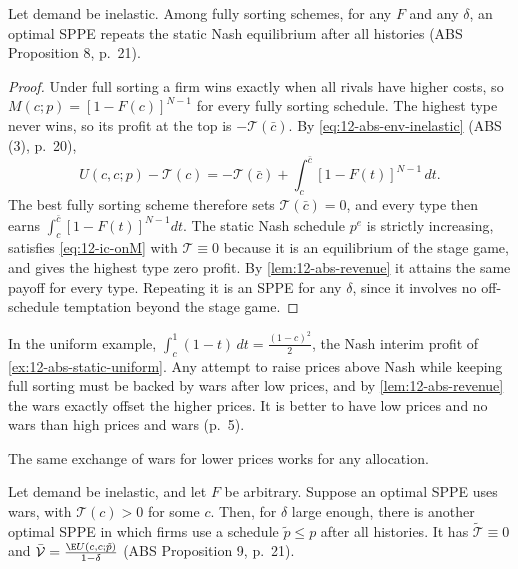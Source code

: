 \begin{proposition}\label{prop:12-abs-fullsort}
Let demand be inelastic. Among fully sorting schemes, for any $F$ and any $\delta$, an optimal SPPE repeats the static
Nash equilibrium after all histories (ABS Proposition 8, p.~21).
\end{proposition}

\begin{proof}
Under full sorting a firm wins exactly when all rivals have higher costs, so $M(c; p) = [1 - F(c)]^{N-1}$ for every
fully sorting schedule. The highest type never wins, so its profit at the top is $-\mathcal T(\bar c)$. By
\eqref{eq:12-abs-env-inelastic} (ABS (3), p.~20),
\begin{equation*}
U(c, c; p) - \mathcal T(c) = -\mathcal T(\bar c) + \int_c^{\bar c}[1 - F(t)]^{N-1}\,dt .
\end{equation*}
The best fully sorting scheme therefore sets $\mathcal T(\bar c) = 0$, and every type then earns
$\int_c^{\bar c}[1 - F(t)]^{N-1}dt$. The static Nash schedule $p^e$ is strictly increasing, satisfies
\eqref{eq:12-ic-onM} with $\mathcal T \equiv 0$ because it is an equilibrium of the stage game, and gives the highest
type zero profit. By \cref{lem:12-abs-revenue} it attains the same payoff for every type. Repeating it is an SPPE for
any $\delta$, since it involves no off-schedule temptation beyond the stage game.
\end{proof}

In the uniform example, $\int_c^1(1 - t)\,dt = \frac{(1 - c)^2}{2}$, the Nash interim profit of
\cref{ex:12-abs-static-uniform}. Any attempt to raise prices above Nash while keeping full sorting must be backed by
wars after low prices, and by \cref{lem:12-abs-revenue} the wars exactly offset the higher prices. It is better to have
low prices and no wars than high prices and wars (p.~5).

The same exchange of wars for lower prices works for any allocation.

\begin{proposition}[No wars]\label{prop:12-abs-nowars}
Let demand be inelastic, and let $F$ be arbitrary. Suppose an optimal SPPE uses wars, with $\mathcal T(c) > 0$ for
some $c$. Then, for $\delta$ large enough, there is another optimal SPPE in which firms use a schedule
$\tilde p \le p$ after all histories. It has $\tilde{\mathcal T} \equiv 0$ and
$\bar{\mathcal V} = \frac{\E U(c, c; \tilde p)}{1 - \delta}$ (ABS Proposition 9, p.~21).
\end{proposition}

